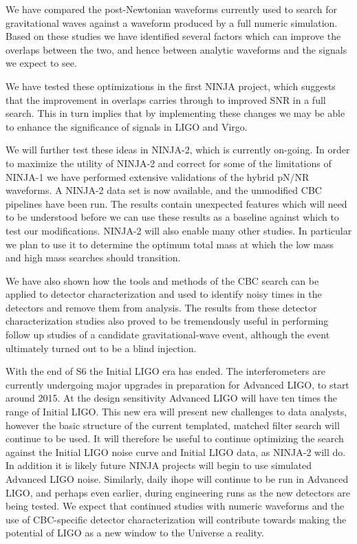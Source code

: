 We have compared the post-Newtonian waveforms currently used to
search for gravitational waves against a waveform produced by 
a full numeric simulation.  Based on these studies we have identified
several factors which can improve the overlaps between the two, and
hence between analytic waveforms and the signals we expect to see.

We have tested these optimizations in the first NINJA project, which
suggests that the improvement in overlaps carries through to improved
SNR in a full search.  This in turn implies that by implementing these
changes we may be able to enhance the significance of signals in LIGO
and Virgo.

We will further test these ideas in NINJA-2, which is currently
on-going.  In order to maximize the utility of NINJA-2 and correct
for some of the limitations of NINJA-1 we have performed extensive
validations of the hybrid pN/NR waveforms.  A NINJA-2 data set is now
available, and the unmodified CBC pipelines have been run.  The
results contain unexpected features which will need to be understood
before we can use these results as a baseline against which to test
our modifications.  NINJA-2 will also enable many other studies.  In
particular we plan to use it to determine the optimum total mass at
which the low mass and high mass searches should transition.

We have also shown how the tools and methods of the CBC search can be
applied to detector characterization and used to identify noisy times
in the detectors and remove them from analysis.  The results from
these detector characterization studies also proved to be tremendously
useful in performing follow up studies of a candidate
gravitational-wave event, although the event ultimately turned out to
be a blind injection.

With the end of S6 the Initial LIGO era has ended.  The
interferometers are currently undergoing major upgrades in preparation
for Advanced LIGO, to start around 2015.  At the design sensitivity
Advanced LIGO will have ten times the range of Initial LIGO.  This new
era will present new challenges to data analysts, however the basic
structure of the current templated, matched filter search will
continue to be used.   It will therefore be useful to continue
optimizing the search against the Initial LIGO noise curve and Initial
LIGO data, as NINJA-2 will do.  In addition it is likely future NINJA
projects will begin to use simulated Advanced LIGO noise.  Similarly,
daily ihope will continue to be run in Advanced LIGO, and perhaps even
earlier, during engineering runs as the new detectors are being
tested.  We expect that continued studies with numeric waveforms and
the use of CBC-specific detector characterization will contribute
towards making the potential of LIGO as a new window to the Universe a
reality.


